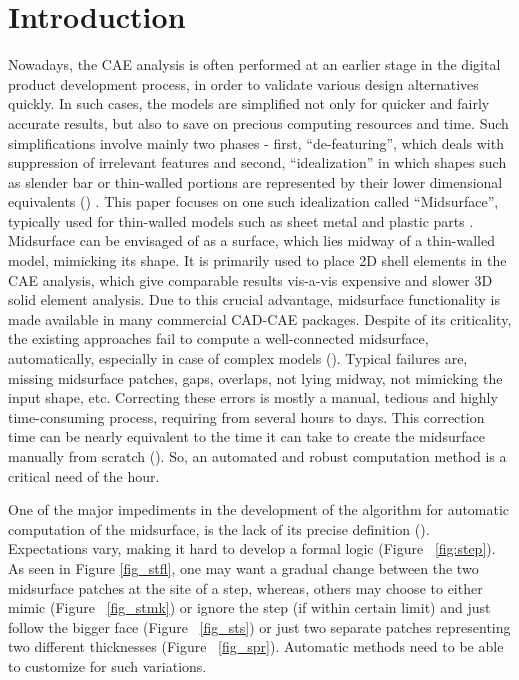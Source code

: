 \section{Introduction}\label{sec:intro}

Nowadays, the CAE analysis is often performed at an earlier stage in the digital product development process, in order to validate various design alternatives quickly. In such cases, the models are simplified not only for quicker and fairly accurate results, but also to save on precious computing resources and time. Such simplifications involve mainly two phases - first, ``de-featuring'', which deals with suppression of irrelevant features and second, ``idealization'' in which shapes such as slender bar or thin-walled portions are represented by their lower dimensional equivalents (\cite{Dabke1994}) . This paper focuses on one such idealization called ``Midsurface'', typically used for thin-walled models such as sheet metal and plastic parts \cite{FEMBook2009} .  
Midsurface can be envisaged of as a surface, which lies midway of a thin-walled model, mimicking its shape.  It is primarily used to place 2D shell elements in the CAE analysis, which give comparable results vis-a-vis  expensive and slower 3D solid element analysis. Due to this crucial advantage, midsurface functionality is made available  in many commercial CAD-CAE packages. Despite of its criticality, the existing approaches fail to compute a well-connected midsurface, automatically, especially in case of complex models (\cite{ Robinson2006, Automex, Woo2013,Stolt2006a,Lockett2008}). Typical failures are, missing midsurface patches, gaps, overlaps, not lying midway, not mimicking the input shape, etc. Correcting these errors is mostly a manual, tedious and highly time-consuming process, requiring from several hours to days. This correction time can be nearly equivalent to the time it can take to create the midsurface manually from scratch (\cite{Stolt2006}).  So, an automated and robust computation method is a critical need of the hour.

One of the major impediments in the development of the algorithm for automatic computation of the midsurface, is the lack of its precise definition (\cite{Ramanathan2004}).  Expectations vary, making it hard to develop a formal logic (Figure ~\ref{fig:step}). As seen in Figure \ref{fig_stfl}, one may want a gradual change between the two midsurface patches at the site of a step, whereas, others may choose to either mimic (Figure ~\ref{fig_stmk}) or ignore the step (if within certain limit) and just follow the bigger face (Figure ~\ref{fig_sts}) or just two separate patches representing two different thicknesses  (Figure ~\ref{fig_spr}). Automatic methods need to be able to customize for such variations.


